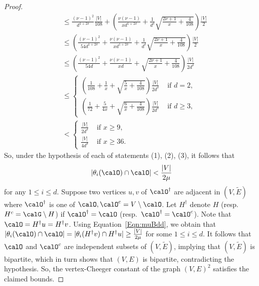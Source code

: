 \begin{proof}
\begin{align*}
& \leq \frac{(\nu -1)^2}{d^{1 + 2\delta}} \frac{|V|}{108} + \left(\frac {\nu(\nu -1)}{xd^{1 + 2\delta}} + \frac 1 {d^{\delta}}\sqrt{\frac{ 2\nu + 1 }{x}
+
\frac{4}{108}
}\right) \frac{|V|}{2} \\
& \leq \left(\frac{(\nu -1)^2}{54 d^{1 + 2\delta}} + \frac {\nu(\nu -1)}{xd^{1 + 2\delta}} + \frac 1 {d^{\delta}}\sqrt{\frac{ 2\nu + 1 }{x}
+
\frac{4}{108}
}\right) \frac{|V|}{2} \\
& \leq \left(\frac{(\nu -1)^2}{54 d} + \frac {\nu(\nu -1)}{xd} + \sqrt{\frac{ 2\nu + 1 }{x}
+
\frac{4}{108}
}\right) \frac{|V|}{2d^{\delta}} \\
& 
\leq 
\begin{cases}
\left(\frac 1{108}+ \frac {1}{x} + \sqrt{\frac{ 5 }{x}
+
\frac{4}{108}
}\right) \frac{|V|}{2 d^{\delta}} 
& \text{ if } d =2, \\
\left(\frac 1{72} + \frac {5}{4x} + \sqrt{\frac{6}{x}
+
\frac{4}{108}
}\right) \frac{|V|}{2 d^{\delta}} 
& \text{ if } d \geq 3, 
\end{cases}
\\
& 
<
\begin{cases}
 \frac{|V|}{2d^{\delta}} 
& \text{ if } x \geq 9, \\
\frac{|V|}{4d^{\delta}} 
& \text{ if } x \geq 36.
\end{cases}
\end{align*}
So, under the hypothesis of each of statements (1), (2), (3), it follows that 
$$
|\theta_i(\calO)\cap \calO|
< \frac{|V|}{2\mu}
$$
for any $1\leq i \leq d$. Suppose two vertices $u, v$ of $\calO^\dag$ are adjacent in $(V, \widetilde E)$ where $\calO^\dag$ is one of $\calO, \calO^c = V \setminus \calO$. Let $H^\dag$ denote $H$ (resp. $H^c = \calG \setminus H$) if $\calO^\dag  = \calO$ (resp.~$\calO^\dag = \calO^c$). Note that $\calO = H^\dag u = H^\dag v$. Using Equation~\eqref{Eqn:muBdd}, we obtain that 
$
|\theta_i(\calO)\cap \calO|
 = |\theta_i(H^\dag v) \cap H^\dag u | 
 \geq \frac{|V|}{2\mu}
$
for some $1\leq i \leq d$. It follows that $\calO$ and $\calO^c$ are independent subsets of $(V, \widetilde E)$, implying that $(V, \widetilde E)$ is bipartite, which in turn shows that $(V, E)$ is bipartite, contradicting the hypothesis. So, the vertex-Cheeger constant of the graph $(V, E)^2$ satisfies the claimed bounds. 
\end{proof}

